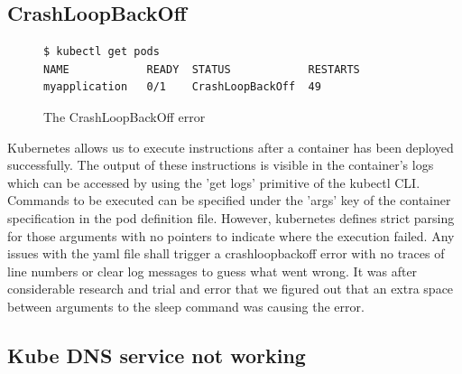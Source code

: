 \documentclass[9pt,twocolumn,twoside]{../../styles/osajnl}
\begin{document}
\subsection{CrashLoopBackOff}
\begin{figure}[H]
\begin{verbatim}
$ kubectl get pods
NAME            READY  STATUS            RESTARTS  
myapplication   0/1    CrashLoopBackOff  49
\end{verbatim}
\caption{The CrashLoopBackOff error}
\vspace{-3mm}
\label{The CrashLoopBackOff error}
\end{figure}
Kubernetes allows us to execute instructions after a container has
been deployed successfully. The output of these instructions is
visible in the container's logs which can be accessed by using the
'get logs' primitive of the kubectl CLI. Commands to be executed can
be specified under the 'args' key of the container specification in
the pod definition file. However, kubernetes defines strict parsing
for those arguments with no pointers to indicate where the execution
failed. Any issues with the yaml file shall trigger a crashloopbackoff
error with no traces of line numbers or clear log messages to guess
what went wrong. It was after considerable research and trial and
error that we figured out that an extra space between arguments to the
sleep command was causing the error.


\subsection{Kube DNS service not working}
\end{document}

